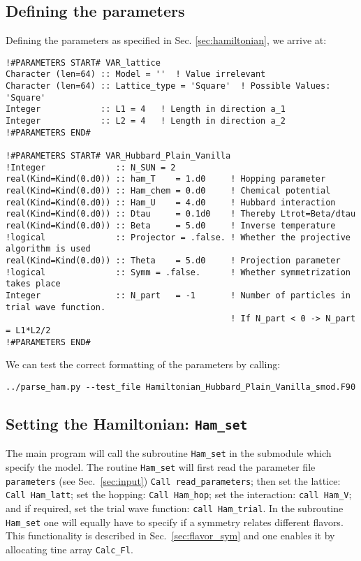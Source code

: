 \subsection{Defining the parameters}
Defining the parameters as specified in Sec. \ref{sec:hamiltonian}, we arrive at:

\begin{lstlisting}[style=fortran]
!#PARAMETERS START# VAR_lattice
Character (len=64) :: Model = ''  ! Value irrelevant
Character (len=64) :: Lattice_type = 'Square'  ! Possible Values: 'Square'
Integer            :: L1 = 4   ! Length in direction a_1
Integer            :: L2 = 4   ! Length in direction a_2
!#PARAMETERS END#

!#PARAMETERS START# VAR_Hubbard_Plain_Vanilla
!Integer              :: N_SUN = 2
real(Kind=Kind(0.d0)) :: ham_T    = 1.d0     ! Hopping parameter
real(Kind=Kind(0.d0)) :: Ham_chem = 0.d0     ! Chemical potential
real(Kind=Kind(0.d0)) :: Ham_U    = 4.d0     ! Hubbard interaction
real(Kind=Kind(0.d0)) :: Dtau     = 0.1d0    ! Thereby Ltrot=Beta/dtau
real(Kind=Kind(0.d0)) :: Beta     = 5.d0     ! Inverse temperature
!logical              :: Projector = .false. ! Whether the projective algorithm is used
real(Kind=Kind(0.d0)) :: Theta    = 5.d0     ! Projection parameter
!logical              :: Symm = .false.      ! Whether symmetrization takes place
Integer               :: N_part   = -1       ! Number of particles in trial wave function.
                                             ! If N_part < 0 -> N_part = L1*L2/2
!#PARAMETERS END#
\end{lstlisting}
We can test the correct formatting of the parameters by calling:
\begin{lstlisting}[style=bash]
../parse_ham.py --test_file Hamiltonian_Hubbard_Plain_Vanilla_smod.F90
\end{lstlisting}

\subsection{Setting the Hamiltonian:  \texttt{Ham\_set} }

The main program will call the subroutine \texttt{Ham\_set} in the submodule 
which specify the model.  The  routine \texttt{Ham\_set}  will first  read the parameter file \texttt{parameters} (see Sec.~\ref{sec:input}) \texttt{Call read\_parameters}; then set the lattice: \texttt{Call Ham\_latt};  set the hopping: \texttt{Call Ham\_hop};  
 set the interaction: \texttt{call Ham\_V}; and if required, set the trial wave function: \texttt{call Ham\_trial}.     In the  subroutine   \texttt{Ham\_set} one  
 will equally  have  to  specify  if  a  symmetry  relates   different  flavors.   This functionality  is   described in  Sec.~\ref{sec:flavor_sym}   and   one  enables it  by allocating  tine  array  \texttt{Calc\_Fl}. 
 
